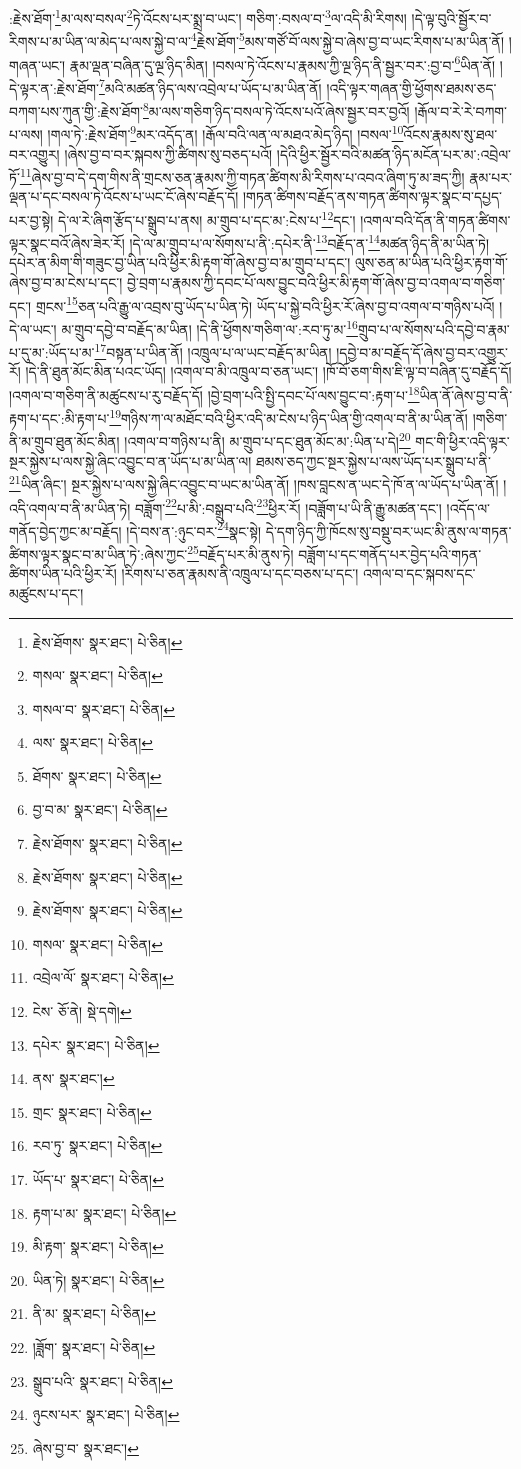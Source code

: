 :རྗེས་ཐོག་\footnote{རྗེས་ཐོགས་  སྣར་ཐང་།  པེ་ཅིན། }མ་ལས་བསལ་\footnote{གསལ་  སྣར་ཐང་།  པེ་ཅིན། }ཏེ་འོངས་པར་སྨྲ་བ་ཡང་། གཅིག་:བསལ་བ་\footnote{གསལ་བ་  སྣར་ཐང་།  པེ་ཅིན། }ལ་འདི་མི་རིགས། །དེ་ལྟ་བུའི་སྦྱོར་བ་རིགས་པ་མ་ཡིན་ལ་མེད་པ་ལས་སྐྱེ་བ་ལ་\footnote{ལས་  སྣར་ཐང་།  པེ་ཅིན། }རྗེས་ཐོག་\footnote{ཐོགས་  སྣར་ཐང་།  པེ་ཅིན། }མས་གཙོ་བོ་ལས་སྐྱེ་བ་ཞེས་བྱ་བ་ཡང་རིགས་པ་མ་ཡིན་ནོ། །གཞན་ཡང་། རྣམ་ལྡན་བཞིན་དུ་ལྔ་ཉིད་མིན། །བསལ་ཏེ་འོངས་པ་རྣམས་ཀྱི་ལྔ་ཉིད་ནི་སྦྱར་བར་:བྱ་བ་\footnote{བྱ་བ་མ་  སྣར་ཐང་།  པེ་ཅིན། }ཡིན་ནོ། །དེ་ལྟར་ན་:རྗེས་ཐོག་\footnote{རྗེས་ཐོགས་  སྣར་ཐང་།  པེ་ཅིན། }མའི་མཚན་ཉིད་ལས་འབྲེལ་པ་ཡོད་པ་མ་ཡིན་ནོ། །འདི་ལྟར་གཞན་གྱི་ཕྱོགས་ཐམས་ཅད་བཀག་པས་ཀུན་གྱི་:རྗེས་ཐོག་\footnote{རྗེས་ཐོགས་  སྣར་ཐང་།  པེ་ཅིན། }མ་ལས་གཅིག་ཉིད་བསལ་ཏེ་འོངས་པའོ་ཞེས་སྦྱར་བར་བྱའོ། །རྒོལ་བ་རེ་རེ་བཀག་པ་ལས། །གལ་ཏེ་:རྗེས་ཐོག་\footnote{རྗེས་ཐོགས་  སྣར་ཐང་།  པེ་ཅིན། }མར་འདོད་ན། །རྒོལ་བའི་ལན་ལ་མཐའ་མེད་ཉིད། །བསལ་\footnote{གསལ་  སྣར་ཐང་།  པེ་ཅིན། }འོངས་རྣམས་སུ་ཐལ་བར་འགྱུར། །ཞེས་བྱ་བ་བར་སྐབས་ཀྱི་ཚིགས་སུ་བཅད་པའོ། །དེའི་ཕྱིར་སྦྱོར་བའི་མཚན་ཉིད་མངོན་པར་མ་:འབྲེལ་ཏོ་\footnote{འབྲེལ་ལོ་  སྣར་ཐང་།  པེ་ཅིན། }ཞེས་བྱ་བ་དེ་དག་གིས་ནི་གྲངས་ཅན་རྣམས་ཀྱི་གཏན་ཚིགས་མི་རིགས་པ་འབའ་ཞིག་ཏུ་མ་ཟད་ཀྱི། རྣམ་པར་ལྡན་པ་དང་བསལ་ཏེ་འོངས་པ་ཡང་ངོ་ཞེས་བརྗོད་དོ། །གཏན་ཚིགས་བརྗོད་ནས་གཏན་ཚིགས་ལྟར་སྣང་བ་དཔྱད་པར་བྱ་སྟེ། དེ་ལ་རེ་ཞིག་རྩོད་པ་སྒྲུབ་པ་ནས། མ་གྲུབ་པ་དང་མ་:ངེས་པ་\footnote{ངེས་  ཅོ་ནེ།  སྡེ་དགེ། }དང་། །འགལ་བའི་དོན་ནི་གཏན་ཚིགས་ལྟར་སྣང་བའོ་ཞེས་ཟེར་རོ། །དེ་ལ་མ་གྲུབ་པ་ལ་སོགས་པ་ནི་:དཔེར་ནི་\footnote{དཔེར་  སྣར་ཐང་།  པེ་ཅིན། }བརྗོད་ན་\footnote{ནས་  སྣར་ཐང་། }མཚན་ཉིད་ནི་མ་ཡིན་ཏེ། དཔེར་ན་མིག་གི་གཟུང་བྱ་ཡིན་པའི་ཕྱིར་མི་རྟག་གོ་ཞེས་བྱ་བ་མ་གྲུབ་པ་དང་། ལུས་ཅན་མ་ཡིན་པའི་ཕྱིར་རྟག་གོ་ཞེས་བྱ་བ་མ་ངེས་པ་དང་། བྱེ་བྲག་པ་རྣམས་ཀྱི་དབང་པོ་ལས་བྱུང་བའི་ཕྱིར་མི་རྟག་གོ་ཞེས་བྱ་བ་འགལ་བ་གཅིག་དང་། གྲངས་\footnote{གྲང་  སྣར་ཐང་།  པེ་ཅིན། }ཅན་པའི་རྒྱུ་ལ་འབྲས་བུ་ཡོད་པ་ཡིན་ཏེ། ཡོད་པ་སྐྱེ་བའི་ཕྱིར་རོ་ཞེས་བྱ་བ་འགལ་བ་གཉིས་པའོ། །དེ་ལ་ཡང་། མ་གྲུབ་དབྱེ་བ་བརྗོད་མ་ཡིན། །དེ་ནི་ཕྱོགས་གཅིག་ལ་:རབ་ཏུ་མ་\footnote{རབ་ཏུ་  སྣར་ཐང་།  པེ་ཅིན། }གྲུབ་པ་ལ་སོགས་པའི་དབྱེ་བ་རྣམ་པ་དུ་མ་:ཡོད་པ་མ་\footnote{ཡོད་པ་  སྣར་ཐང་།  པེ་ཅིན། }བསྟན་པ་ཡིན་ནོ། །འཁྲུལ་པ་ལ་ཡང་བརྗོད་མ་ཡིན། །དབྱེ་བ་མ་བརྗོད་དོ་ཞེས་བྱ་བར་འགྱུར་རོ། །དེ་ནི་ཐུན་མོང་མིན་པའང་ཡོད། །འགལ་བ་མི་འཁྲུལ་བ་ཅན་ཡང་། །ཁོ་བོ་ཅག་གིས་ཇི་ལྟ་བ་བཞིན་དུ་བརྗོད་དོ། །འགལ་བ་གཅིག་ནི་མཚུངས་པ་རུ་བརྗོད་དོ། །བྱེ་བྲག་པའི་སྤྱི་དབང་པོ་ལས་བྱུང་བ་:རྟག་པ་\footnote{རྟག་པ་མ་  སྣར་ཐང་།  པེ་ཅིན། }ཡིན་ནོ་ཞེས་བྱ་བ་ནི་རྟག་པ་དང་:མི་རྟག་པ་\footnote{མི་རྟག་  སྣར་ཐང་།  པེ་ཅིན། }གཉིས་ཀ་ལ་མཐོང་བའི་ཕྱིར་འདི་མ་ངེས་པ་ཉིད་ཡིན་གྱི་འགལ་བ་ནི་མ་ཡིན་ནོ། །གཅིག་ནི་མ་གྲུབ་ཐུན་མོང་མིན། །འགལ་བ་གཉིས་པ་ནི། མ་གྲུབ་པ་དང་ཐུན་མོང་མ་:ཡིན་པ་དེ།\footnote{ཡིན་ཏེ།  སྣར་ཐང་།  པེ་ཅིན། } གང་གི་ཕྱིར་འདི་ལྟར་སྔར་སྐྱེས་པ་ལས་སྐྱེ་ཞིང་འབྱུང་བ་ན་ཡོད་པ་མ་ཡིན་ལ། ཐམས་ཅད་ཀྱང་སྔར་སྐྱེས་པ་ལས་ཡོད་པར་སྒྲུབ་པ་ནི་\footnote{ནི་མ་  སྣར་ཐང་།  པེ་ཅིན། }ཡིན་ཞིང་། སྔར་སྐྱེས་པ་ལས་སྐྱེ་ཞིང་འབྱུང་བ་ཡང་མ་ཡིན་ནོ། །ཁས་བླངས་ན་ཡང་དེ་ཁོ་ན་ལ་ཡོད་པ་ཡིན་ནོ། །འདི་འགལ་བ་ནི་མ་ཡིན་ཏེ། བཟློག་\footnote{།ཟློག་  སྣར་ཐང་།  པེ་ཅིན། }པ་མི་:བསྒྲུབ་པའི་\footnote{སྒྲུབ་པའི་  སྣར་ཐང་།  པེ་ཅིན། }ཕྱིར་རོ། །བཟློག་པ་ཡི་ནི་རྒྱུ་མཚན་དང་། །འདོད་ལ་གནོད་བྱེད་ཀྱང་མ་བརྗོད། །དེ་བས་ན་:ཉུང་བར་\footnote{ཉུངས་པར་  སྣར་ཐང་།  པེ་ཅིན། }སྣང་སྟེ། དེ་དག་ཉིད་ཀྱི་ཁོངས་སུ་བསྡུ་བར་ཡང་མི་ནུས་ལ་གཏན་ཚིགས་ལྟར་སྣང་བ་མ་ཡིན་ཏེ་:ཞེས་ཀྱང་\footnote{ཞེས་བྱ་བ་  སྣར་ཐང་། }བརྗོད་པར་མི་ནུས་ཏེ། བཟློག་པ་དང་གནོད་པར་བྱེད་པའི་གཏན་ཚིགས་ཡིན་པའི་ཕྱིར་རོ། །རིགས་པ་ཅན་རྣམས་ནི་འཁྲུལ་པ་དང་བཅས་པ་དང་། འགལ་བ་དང་སྐབས་དང་མཚུངས་པ་དང་། 